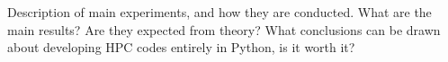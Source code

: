 \documentclass{IEEEcsmag}
\begin{document}
Description of main experiments, and how they are conducted. What are the main results? Are they expected from theory? What conclusions can be drawn about developing HPC codes entirely in Python, is it worth it?






\end{document}
